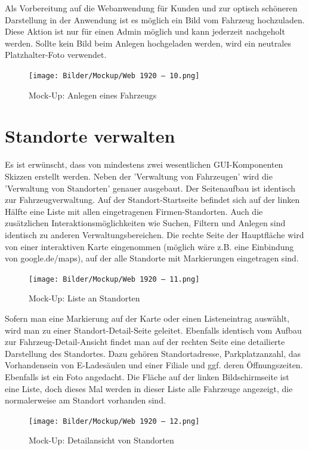 Als Vorbereitung auf die Webanwendung für Kunden und zur optisch schöneren Darstellung in der Anwendung ist es möglich ein Bild vom Fahrzeug hochzuladen. Diese Aktion ist nur für einen Admin möglich und kann jederzeit nachgeholt werden. Sollte kein Bild beim Anlegen hochgeladen werden, wird ein neutrales Platzhalter-Foto verwendet. 

\begin{figure}[!ht]
    \centering
    \texttt{[image: Bilder/Mockup/Web 1920 – 10.png]}
    \caption{Mock-Up: Anlegen eines Fahrzeugs}
    \label{mu:anlegen}
\end{figure}

\section{Standorte verwalten}

Es ist erwünscht, dass von mindestens zwei wesentlichen GUI-Komponenten Skizzen erstellt werden. Neben der 'Verwaltung von Fahrzeugen' wird die 'Verwaltung von Standorten' genauer ausgebaut. Der Seitenaufbau ist identisch zur Fahrzeugverwaltung. Auf der Standort-Startseite befindet sich auf der linken Hälfte eine Liste mit allen eingetragenen Firmen-Standorten. Auch die zusätzlichen Interaktionsmöglichkeiten wie Suchen, Filtern und Anlegen sind identisch zu anderen Verwaltungsbereichen. Die rechte Seite der Hauptfläche wird von einer interaktiven Karte eingenommen (möglich wäre z.B. eine Einbindung von google.de/maps), auf der alle Standorte mit Markierungen eingetragen sind. 

\begin{figure}[!ht]
    \centering
    \texttt{[image: Bilder/Mockup/Web 1920 – 11.png]}
    \caption{Mock-Up: Liste an Standorten}
    \label{mu:standortliste}
\end{figure}


Sofern man eine Markierung auf der Karte oder einen Listeneintrag auswählt, wird man zu einer Standort-Detail-Seite geleitet. Ebenfalls identisch vom Aufbau zur Fahrzeug-Detail-Ansicht findet man auf der rechten Seite eine detailierte Darstellung des Standortes. Dazu gehören Standortadresse, Parkplatzanzahl, das Vorhandensein von E-Ladesäulen und einer Filiale und ggf. deren Öffnungszeiten. Ebenfalls ist ein Foto angedacht. Die Fläche auf der linken Bildschirmseite ist eine Liste, doch dieses Mal werden in dieser Liste alle Fahrzeuge angezeigt, die normalerweise am Standort vorhanden sind.  

\begin{figure}[!ht]
    \centering
    \texttt{[image: Bilder/Mockup/Web 1920 – 12.png]}
    \caption{Mock-Up: Detailansicht von Standorten}
    \label{mu:standortdetails}
\end{figure}

